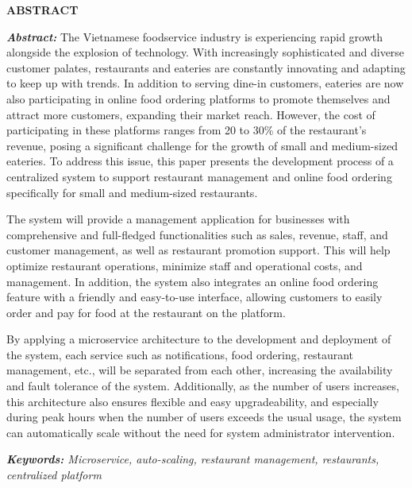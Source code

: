 \newpage
{}
\begin{center}
    \textbf{ABSTRACT}
\end{center}
\changefontsizes[16pt]{12pt}
\textit{\textbf{Abstract: }} 
The Vietnamese foodservice industry is experiencing rapid growth alongside the explosion of technology.
With increasingly sophisticated and diverse customer palates, restaurants and eateries are constantly innovating and adapting to keep up with trends.
In addition to serving dine-in customers, eateries are now also participating in online food ordering platforms to promote themselves and attract more customers, expanding their market reach.
However, the cost of participating in these platforms ranges from 20 to 30\% of the restaurant's revenue, posing a significant challenge for the growth of small and medium-sized eateries.
To address this issue, this paper presents the development process of a centralized system to support restaurant management and online food ordering specifically for small and medium-sized restaurants.

The system will provide a management application for businesses with comprehensive and full-fledged functionalities such as sales, revenue, staff, and customer management, as well as restaurant promotion support.
This will help optimize restaurant operations, minimize staff and operational costs, and management.
In addition, the system also integrates an online food ordering feature with a friendly and easy-to-use interface, allowing customers to easily order and pay for food at the restaurant on the platform.

By applying a microservice architecture to the development and deployment of the system, each service such as notifications, food ordering, restaurant management, etc., will be separated from each other, increasing the availability and fault tolerance of the system.
Additionally, as the number of users increases, this architecture also ensures flexible and easy upgradeability, and especially during peak hours when the number of users exceeds the usual usage, the system can automatically scale without the need for system administrator intervention.
\vspace{-0.5cm}
\begin{flushleft}
  \textit{\textbf{Keywords: } Microservice, auto-scaling, restaurant management, restaurants, centralized platform}
\end{flushleft}
\changefontsizes[16pt]{13pt}
